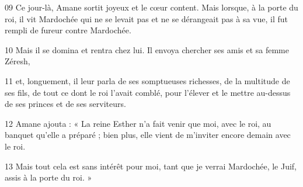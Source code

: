 
09 Ce jour-là, Amane sortit joyeux et le cœur content. Mais lorsque, à la porte du roi, il vit Mardochée qui ne se levait pas et ne se dérangeait pas à sa vue, il fut rempli de fureur contre Mardochée.

10 Mais il se domina et rentra chez lui. Il envoya chercher ses amis et sa femme Zéresh,

11 et, longuement, il leur parla de ses somptueuses richesses, de la multitude de ses fils, de tout ce dont le roi l’avait comblé, pour l’élever et le mettre au-dessus de ses princes et de ses serviteurs.

12 Amane ajouta : « La reine Esther n’a fait venir que moi, avec le roi, au banquet qu’elle a préparé ; bien plus, elle vient de m’inviter encore demain avec le roi.

13 Mais tout cela est sans intérêt pour moi, tant que je verrai Mardochée, le Juif, assis à la porte du roi. »